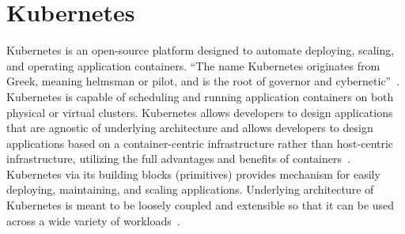 \section{Kubernetes}

Kubernetes is an open-source platform designed to automate deploying, scaling, and operating application containers. ``The name Kubernetes originates from Greek, meaning helmsman or pilot, and is the root of governor and cybernetic''~\cite{hid-sp18-510-web-Kubernetes}. Kubernetes is capable of scheduling and running application containers on both physical or virtual clusters. Kubernetes allows developers to design applications that are agnostic of underlying architecture and allows developers to design applications based on a container-centric infrastructure rather than host-centric infrastructure, utilizing the full advantages and benefits of containers~\cite{hid-sp18-510-med-Kubernetes}. Kubernetes via its building blocks (primitives) provides mechanism for easily deploying, maintaining, and scaling applications. Underlying architecture of Kubernetes is meant to be loosely coupled and extensible so that it can be used across a wide variety of workloads~\cite{hid-sp18-510-wiki-Kubernetes}.
